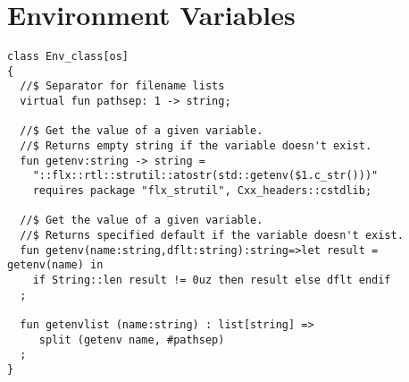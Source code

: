 \documentclass[oneside]{book}
\begin{document}
\section{Environment Variables}
\begin{verbatim}
class Env_class[os]
{
  //$ Separator for filename lists
  virtual fun pathsep: 1 -> string;

  //$ Get the value of a given variable.
  //$ Returns empty string if the variable doesn't exist.
  fun getenv:string -> string =
    "::flx::rtl::strutil::atostr(std::getenv($1.c_str()))"
    requires package "flx_strutil", Cxx_headers::cstdlib;

  //$ Get the value of a given variable.
  //$ Returns specified default if the variable doesn't exist.
  fun getenv(name:string,dflt:string):string=>let result = getenv(name) in 
    if String::len result != 0uz then result else dflt endif
  ;

  fun getenvlist (name:string) : list[string] =>
     split (getenv name, #pathsep)
  ;
}
\end{verbatim}
\end{document}
